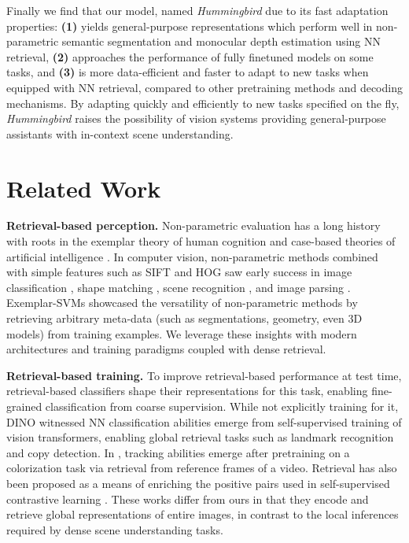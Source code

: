 \documentclass{article}
\newcommand{\ours}{\textit{Hummingbird} }
\begin{document}
Finally we find that our model, named \ours due to its fast adaptation properties: \textbf{(1)} yields general-purpose representations which perform well in non-parametric semantic segmentation and monocular depth estimation using NN retrieval, \textbf{(2)} approaches the performance of fully finetuned models on some tasks, and \textbf{(3)} is more data-efficient and faster to adapt to new tasks when equipped with NN retrieval, compared to other pretraining methods and decoding mechanisms.
By adapting quickly and efficiently to new tasks specified on the fly, \ours raises the possibility of vision systems providing general-purpose assistants with in-context scene understanding.


\section{Related Work}
\vspace{-0.1em}

\textbf{Retrieval-based perception. }
Non-parametric evaluation has a long history with roots in the exemplar theory of human cognition \cite{ashby2005human,homa1981limitations,nosofsky1986attention} and case-based theories of artificial intelligence \cite{aamodt1994case,schank1999dynamic}. In computer vision, non-parametric methods combined with simple features such as SIFT \cite{lowe2004distinctive} and HOG \cite{dalal2005histograms} saw early success in image classification \cite{boiman2008defense}, shape matching \cite{belongie2002shape,berg2005shape,shechtman2007matching}, scene recognition \cite{torralba200880,xiao2010sun}, and image parsing \cite{liu2009nonparametric}. Exemplar-SVMs \cite{malisiewicz2011ensemble} showcased the versatility of non-parametric methods by retrieving arbitrary meta-data (such as segmentations, geometry, even 3D models) from training examples. We leverage these insights with modern architectures and training paradigms coupled with dense retrieval.

\textbf{Retrieval-based training. }
To improve retrieval-based performance at test time, retrieval-based classifiers \cite{touvron2021grafit, wu2018improving} shape their representations for this task, enabling fine-grained classification from coarse supervision. While not explicitly training for it, DINO \cite{caron2021emerging} witnessed NN classification abilities emerge from self-supervised training of vision transformers, enabling global retrieval tasks such as landmark recognition and copy detection. In \cite{Vondrick_2018_ECCV}, tracking abilities emerge after pretraining on a colorization task via retrieval from reference frames of a video. Retrieval has also been proposed as a means of enriching the positive pairs used in self-supervised contrastive learning \cite{dwibedi2021little}. These works differ from ours in that they encode and retrieve global representations of entire images, in contrast to the local inferences required by dense scene understanding tasks. 
\end{document}
